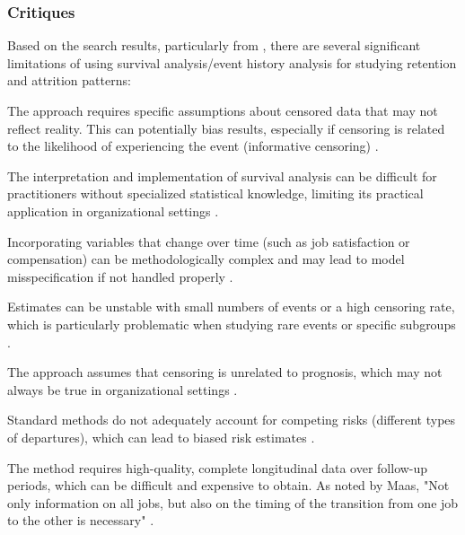 \documentclass[../main.tex]{subfiles}
\begin{document}
\subsubsection{Critiques}

Based on the search results, particularly from \parencite{limitations2016survival}, there are several significant limitations of using survival analysis/event history analysis for studying retention and attrition patterns:

The approach requires specific assumptions about censored data that may not reflect reality. This can potentially bias results, especially if censoring is related to the likelihood of experiencing the event (informative censoring) \parencite{limitations2016survival}.

The interpretation and implementation of survival analysis can be difficult for practitioners without specialized statistical knowledge, limiting its practical application in organizational settings \parencite{limitations2016survival}.

Incorporating variables that change over time (such as job satisfaction or compensation) can be methodologically complex and may lead to model misspecification if not handled properly \parencite{limitations2016survival}.

Estimates can be unstable with small numbers of events or a high censoring rate, which is particularly problematic when studying rare events or specific subgroups \parencite{limitations2016survival}.

The approach assumes that censoring is unrelated to prognosis, which may not always be true in organizational settings \parencite{limitations2016survival}.

Standard methods do not adequately account for competing risks (different types of departures), which can lead to biased risk estimates \parencite{limitations2016survival}.

The method requires high-quality, complete longitudinal data over follow-up periods, which can be difficult and expensive to obtain. As noted by Maas, "Not only information on all jobs, but also on the timing of the transition from one job to the other is necessary" \parencite{maas2003use}.
\end{document}
